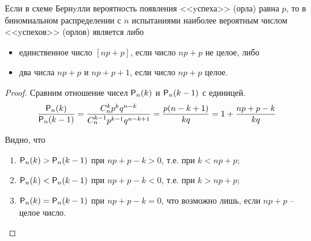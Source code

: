 \begin{theorem}
\label{th:8.3}
	 Если в схеме Бернyлли вероятность появления <<yспеха>>
(орла) равна $p$, то в биномиальном распределении с $n$ испытаниями наиболее вероятным числом <<yспехов>> (орлов) является либо
	\begin{itemize}
		\item единственное число $[np + p]$, если число $np + p$ не целое, либо
		\item два числа $np + p$ и $np + p + 1$, если число $np + p$ целое.
	\end{itemize}
\end{theorem}
\begin{proof}
	Сравним отношение чисел $\P_n (k)$ и $\P_n (k - 1)$ с единицей.
\begin{equation*}
	\frac{\P_n (k)}{\P_n (k - 1)}=\frac{C_n^k p^k q^{n-k}}{C_n^{k-1} p^{k-1} q^{n-k+1}}=\frac{p(n-k+1)}{kq}=1+\frac{np+p-k}{kq}
\end{equation*}

Видно, что
\begin{enumerate}
	\item $\P_n (k) > \P_n (k - 1)$ при $np + p - k > 0$, т.е. при $k < np + p$;
	\item $\P_n (k) < \P_n (k - 1)$ при $np + p - k < 0$, т.е. при $k > np + p$;
	\item $\P_n (k) = \P_n (k - 1)$ при $np + p - k = 0$, что возможно лишь, если $np + p$ -- целое число.
\end{enumerate}
\end{proof}
